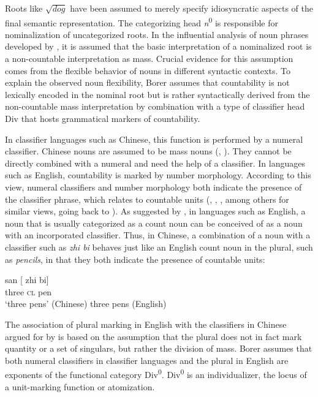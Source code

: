\documentclass[output=paper,colorlinks,citecolor=brown,
]{langscibook}
\newcommand{\minsp}[1]{#1\hspace{-2pt}} %
\begin{document}
Roots like $\sqrt{dog}$ have been assumed to merely specify idiosyncratic aspects of the final semantic representation. The categorizing head \textit{n}\textsuperscript{0} is responsible for nominalization of uncategorized roots. In the influential analysis of noun phrases developed by \citet{Borer2005}, it is assumed that the basic interpretation of a nominalized root is a non-countable interpretation as mass. Crucial evidence for this assumption comes from the flexible behavior of nouns in different syntactic contexts. To explain the observed noun flexibility, Borer assumes that countability is not lexically encoded in the nominal root but is rather syntactically derived from the non-countable mass interpretation by combination with a type of classifier head Div that hosts grammatical markers of countability. 

In classifier languages such as Chinese, this function is performed by a numeral classifier. Chinese nouns are assumed to be mass nouns (\citealt{Chierchia1998}, \citealt{Krifka1995}). They cannot be directly combined with a numeral and need the help of a classifier. In languages such as English, countability is marked by number morphology. According to this view, numeral classifiers and number morpho\-logy both indicate the presence of the classifier phrase, which relates to countable units (\citealt{Li2013}, \citealt{ChengSybesma1999}, \citealt{Chierchia1998}, among others for similar views, going back to \citealt{Greenberg1972}). As suggested by \citet{Kratzer2007}, in languages such as English, a noun that is usually categorized as a count noun can be conceived of as a noun with an incorporated classifier. Thus, in Chinese, a combination of a noun with a classifier such as \textit{zhi bi} behaves just like an English count noun in the plural, such as \textit{pencils}, in that they both indicate the presence of countable units:

\ea\label{ex:2}
\ea
\gll san \minsp{[} zhi bi] \\ 
     three {} \textsc{cl} pen \\ 
\glt `three pens' \hfill (Chinese)
\label{ex:2a}
\ex three pens \hfill (English) 
\label{ex:2b}
\z\z

\noindent The association of plural marking in English with the classifiers in Chinese argued for by \citet{Borer2005} is based on the assumption that the plural does not in fact mark quantity or a set of singulars, but rather the division of mass. Borer assumes that both numeral classifiers in classifier languages and the plural in English are exponents of the functional category Div\textsuperscript{0}. Div\textsuperscript{0} is an individualizer, the locus of a unit-marking function or atomization. 
\end{document}
